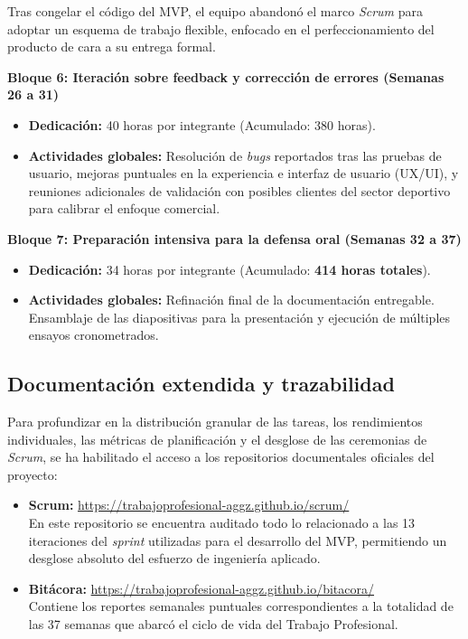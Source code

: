 Tras congelar el código del MVP, el equipo abandonó el marco \textit{Scrum} para adoptar un esquema de trabajo flexible, enfocado en el perfeccionamiento del producto de cara a su entrega formal.

\textbf{Bloque 6: Iteración sobre feedback y corrección de errores (Semanas 26 a 31)}
\begin{itemize}
    \item \textbf{Dedicación:} 40 horas por integrante (Acumulado: 380 horas).
    \item \textbf{Actividades globales:} Resolución de \textit{bugs} reportados tras las pruebas de usuario, mejoras puntuales en la experiencia e interfaz de usuario (UX/UI), y reuniones adicionales de validación con posibles clientes del sector deportivo para calibrar el enfoque comercial.
\end{itemize}

\textbf{Bloque 7: Preparación intensiva para la defensa oral (Semanas 32 a 37)}
\begin{itemize}
    \item \textbf{Dedicación:} 34 horas por integrante (Acumulado: \textbf{414 horas totales}).
    \item \textbf{Actividades globales:} Refinación final de la documentación entregable. Ensamblaje de las diapositivas para la presentación y ejecución de múltiples ensayos cronometrados.
\end{itemize}

\subsection{Documentación extendida y trazabilidad}

Para profundizar en la distribución granular de las tareas, los rendimientos individuales, las métricas de planificación y el desglose de las ceremonias de \textit{Scrum}, se ha habilitado el acceso a los repositorios documentales oficiales del proyecto:

\begin{itemize}
    \item \textbf{Scrum:} \href{https://trabajoprofesional-aggz.github.io/scrum/}{https://trabajoprofesional-aggz.github.io/scrum/} \\
    En este repositorio se encuentra auditado todo lo relacionado a las 13 iteraciones del \textit{sprint} utilizadas para el desarrollo del MVP, permitiendo un desglose absoluto del esfuerzo de ingeniería aplicado.
    \item \textbf{Bitácora:} \href{https://trabajoprofesional-aggz.github.io/bitacora/}{https://trabajoprofesional-aggz.github.io/bitacora/} \\
    Contiene los reportes semanales puntuales correspondientes a la totalidad de las 37 semanas que abarcó el ciclo de vida del Trabajo Profesional.
\end{itemize}
